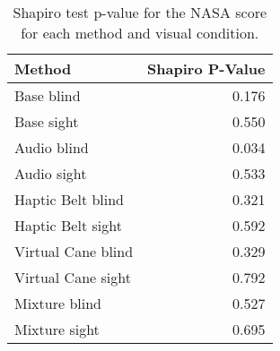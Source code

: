 
\begin{table}[!htb]
\centering
\caption{Shapiro test p-value for the NASA score for each method and visual condition.}
\label{tab:shapiro_nasa_score}
\begin{tabular}{lr}
\toprule
            Method &  Shapiro P-Value \\
\midrule
        Base blind &            0.176 \\
        Base sight &            0.550 \\
       Audio blind &            0.034 \\
       Audio sight &            0.533 \\
 Haptic Belt blind &            0.321 \\
 Haptic Belt sight &            0.592 \\
Virtual Cane blind &            0.329 \\
Virtual Cane sight &            0.792 \\
     Mixture blind &            0.527 \\
     Mixture sight &            0.695 \\
\bottomrule
\end{tabular}
\end{table}

